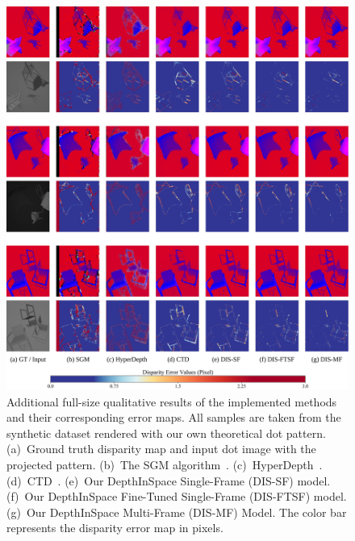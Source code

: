 \begin{figure}
    \begin{center}
        \includegraphics[width=1\linewidth]{images/chapter2/supp_figures/supp_results_2.jpg}
    \end{center}
   \caption{Additional full-size qualitative results of the implemented methods and their corresponding error maps. All samples are taken from the synthetic dataset rendered with our own theoretical dot pattern. (a)~Ground truth disparity map and input dot image with the projected pattern. (b)~The SGM algorithm~\citep{hirschmuller2007stereo}. (c)~HyperDepth~\citep{ryan2016hyperdepth}. (d)~CTD~\citep{riegler2019connecting}. (e)~Our DepthInSpace Single-Frame (DIS-SF) model. (f)~Our DepthInSpace Fine-Tuned Single-Frame (DIS-FTSF) model. (g)~Our DepthInSpace Multi-Frame (DIS-MF) Model. The color bar represents the disparity error map in pixels.}
    \label{fig:c2_sim_results}
\end{figure}

